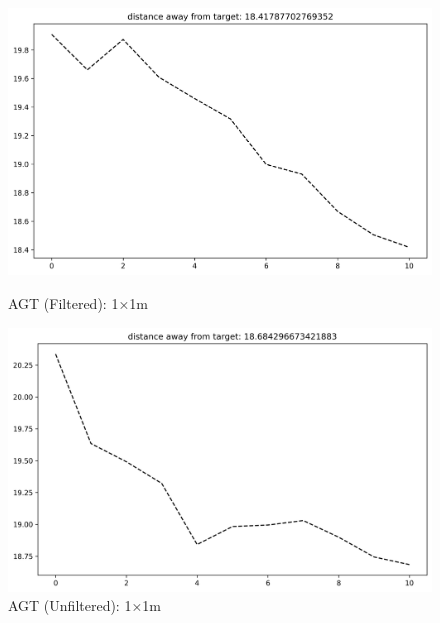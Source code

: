 \documentclass[runningheads]{llncs}
\begin{document}
\begin{figure}[H]
	\centering
	\begin{minipage}{0.49\textwidth}
		\centering
		\includegraphics[width=\textwidth]{figures/filtered/svm_custom_1.png}
		\caption*{AGT (Filtered): 1×1m}
	\end{minipage}
	\hfill
	\begin{minipage}{0.49\textwidth}
		\centering
		\includegraphics[width=\textwidth]{figures/unfiltered/svm_custom_1.png}
		\caption*{AGT (Unfiltered): 1×1m}
	\end{minipage}
\end{figure}
\end{document}
